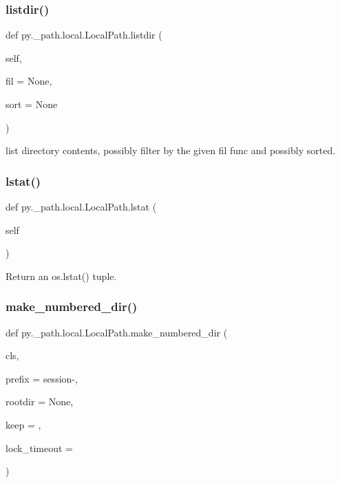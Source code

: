 \subsubsection{\texorpdfstring{listdir()}{listdir()}}
{\footnotesize\ttfamily def py.\+\_\+path.\+local.\+Local\+Path.\+listdir (\begin{DoxyParamCaption}\item[{}]{self,  }\item[{}]{fil = {\ttfamily None},  }\item[{}]{sort = {\ttfamily None} }\end{DoxyParamCaption})}

\begin{DoxyVerb}list directory contents, possibly filter by the given fil func
    and possibly sorted.
\end{DoxyVerb}
 \mbox{\label{classpy_1_1__path_1_1local_1_1_local_path_a2b9157d03687cea52d7598568909307a}} 
\subsubsection{\texorpdfstring{lstat()}{lstat()}}
{\footnotesize\ttfamily def py.\+\_\+path.\+local.\+Local\+Path.\+lstat (\begin{DoxyParamCaption}\item[{}]{self }\end{DoxyParamCaption})}

\begin{DoxyVerb}Return an os.lstat() tuple. \end{DoxyVerb}
 \mbox{\label{classpy_1_1__path_1_1local_1_1_local_path_a5d7ec5e02caaf212229085e2a0129b97}} 
\subsubsection{\texorpdfstring{make\+\_\+numbered\+\_\+dir()}{make\_numbered\_dir()}}
{\footnotesize\ttfamily def py.\+\_\+path.\+local.\+Local\+Path.\+make\+\_\+numbered\+\_\+dir (\begin{DoxyParamCaption}\item[{}]{cls,  }\item[{}]{prefix = {\ttfamily \textquotesingle{}session-\/\textquotesingle{}},  }\item[{}]{rootdir = {\ttfamily None},  }\item[{}]{keep = {},  }\item[{}]{lock\+\_\+timeout = {} }\end{DoxyParamCaption})}

